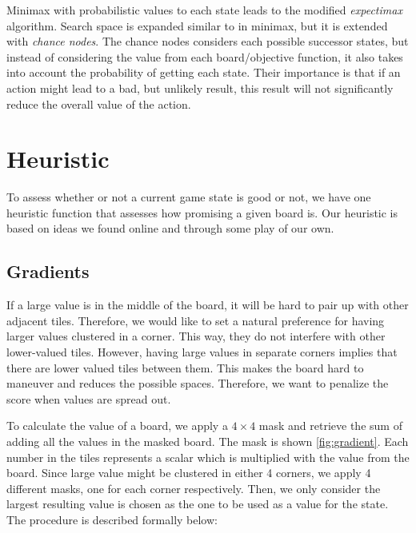 \documentclass[journal]{IEEEtran}
\begin{document}
Minimax with probabilistic values to each state leads to the modified \textit{expectimax} algorithm.
Search space is expanded similar to in minimax, but it is extended with 
\textit{chance nodes}.  The chance nodes considers each possible successor states, but instead
of considering the value from each board/objective function, it also takes into account 
the probability of getting each state.
Their importance is that if an action might lead to a bad, but unlikely result,
this result will not significantly reduce the overall value of the action.

\section*{Heuristic}

To assess whether or not a current game state is good or not, we have one
heuristic function that assesses how promising a given board is. 
Our heuristic is based on ideas we found online and through some play of our
own.

\subsection*{Gradients}
If a large value is in the middle of the board, it will be hard to pair up
with other adjacent tiles. Therefore, we would like to set a natural preference
for having larger values clustered in a corner. This way, they do not interfere
with other lower-valued tiles. However, having large values
in separate corners implies that there are lower valued tiles between them.
This makes the board hard to maneuver and reduces the possible spaces. 
Therefore, we want to penalize the score when values are spread out.

To calculate the value of a board, we apply a $4\times{}4$ mask and retrieve the
sum of adding all the values in the masked board.
The mask is shown \autoref{fig:gradient}. Each number in the tiles represents a
scalar which is multiplied with the value from the board. Since large value
might be clustered in either 4 corners, we apply 4 different masks, one for
each corner respectively.  Then, we only consider the largest resulting value
is chosen as the one to be used as a value for the state. The procedure is
described formally below:
\end{document}
